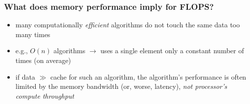 \documentclass[12pt,dvipdfmx]{beamer}
\newcommand{\aka}[1]{{\color{red}#1}}
\begin{document}
\begin{frame}
\frametitle{What does memory performance imply for FLOPS?}
\begin{itemize}
\item<1-> many computationally \emph{efficient} algorithms do not touch 
  the same data too many times
\item<2-> e.g., $O(n)$ algorithms $\rightarrow$ 
  uses a single element only a constant number of times (on average)

\item<3-> if data $\gg$ cache for such an algorithm,
  the algorithm's performance is often 
  limited by the memory bandwidth (or, worse, latency), 
  \aka{\em not processor's compute throughput}
\end{itemize}
\end{frame}
\end{document}
